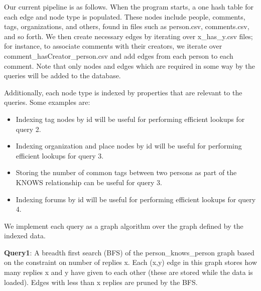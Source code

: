 \documentclass{article}
\begin{document}



Our current pipeline is as follows.  When the program starts, a one
hash table for each edge and node type is populated.  These nodes
include people, comments, tags, organizations, and others, found in
files such as person.csv, comments.csv, and so forth. We then create
necessary edges by iterating over x\_has\_y.csv files; for instance,
to associate comments with their creators, we iterate over
comment\_hasCreator\_person.csv and add edges from each person to each
comment.  Note that only nodes and edges which are required in some
way by the queries will be added to the database.


Additionally, each node type is indexed by properties that are 
relevant to the queries. Some examples are:


\begin{itemize}
\item Indexing tag nodes by id will be useful for performing efficient 
lookups for query 2.
\item Indexing organization and place nodes by id will be useful for 
performing efficient lookups for query 3.
\item Storing the number of common tags between two persons as part of 
the KNOWS relationship can be useful for query 3.
\item Indexing forums by id will be useful for performing efficient lookups 
for query 4.
\end{itemize}

We implement each query as a graph algorithm over the graph defined by
the indexed data.

\textbf{Query1}: A breadth first search (BFS) of the
person\_knows\_person graph based on the constraint on number of replies
x.  Each (x,y) edge in this graph stores how many replies x and y have
given to each other (these are stored while the data is loaded). Edges
with less than x replies are pruned by the BFS.
\end{document}
